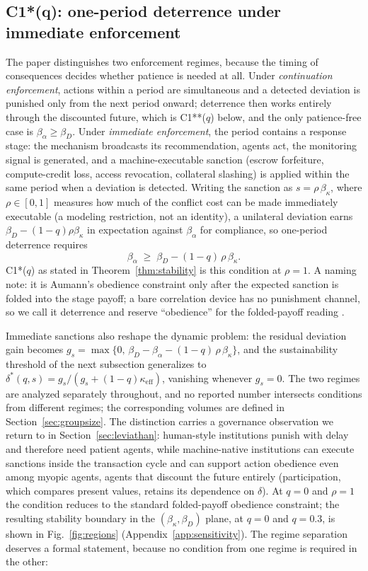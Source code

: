 \documentclass[manuscript,screen,review]{jair}
\begin{document}
\subsection{C1*(q): one-period deterrence under immediate enforcement}
\label{sec:c1star}

The paper distinguishes two enforcement regimes, because the timing of consequences decides whether patience is needed at all. Under \emph{continuation enforcement}, actions within a period are simultaneous and a detected deviation is punished only from the next period onward; deterrence then works entirely through the discounted future, which is C1**($q$) below, and the only patience-free case is $\beta_\alpha \geq \beta_D$. Under \emph{immediate enforcement}, the period contains a response stage: the mechanism broadcasts its recommendation, agents act, the monitoring signal is generated, and a machine-executable sanction (escrow forfeiture, compute-credit loss, access revocation, collateral slashing) is applied within the same period when a deviation is detected. Writing the sanction as $s = \rho\,\beta_\kappa$, where $\rho \in [0,1]$ measures how much of the conflict cost can be made immediately executable (a modeling restriction, not an identity), a unilateral deviation earns $\beta_D - (1-q)\rho\beta_\kappa$ in expectation against $\beta_\alpha$ for compliance, so one-period deterrence requires
\begin{equation*}
\beta_\alpha \;\geq\; \beta_D - (1-q)\,\rho\,\beta_\kappa .
\end{equation*}
C1*($q$) as stated in Theorem~\ref{thm:stability} is this condition at $\rho = 1$. A naming note: it is Aumann's obedience constraint only after the expected sanction is folded into the stage payoff; a bare correlation device has no punishment channel, so we call it deterrence and reserve ``obedience'' for the folded-payoff reading \cite{aumann.1974,aumann.1987}.

Immediate sanctions also reshape the dynamic problem: the residual deviation gain becomes $g_s = \max\{0,\, \beta_D - \beta_\alpha - (1-q)\,\rho\,\beta_\kappa\}$, and the sustainability threshold of the next subsection generalizes to $\delta^*(q,s) = g_s/(g_s + (1-q)\kappa_{\mathrm{eff}})$, vanishing whenever $g_s = 0$. The two regimes are analyzed separately throughout, and no reported number intersects conditions from different regimes; the corresponding volumes are defined in Section~\ref{sec:groupsize}. The distinction carries a governance observation we return to in Section~\ref{sec:leviathan}: human-style institutions punish with delay and therefore need patient agents, while machine-native institutions can execute sanctions inside the transaction cycle and can support action obedience even among myopic agents, agents that discount the future entirely (participation, which compares present values, retains its dependence on $\delta$). At $q=0$ and $\rho=1$ the condition reduces to the standard folded-payoff obedience constraint; the resulting stability boundary in the $(\beta_\kappa, \beta_D)$ plane, at $q=0$ and $q=0.3$, is shown in Fig.~\ref{fig:regions} (Appendix~\ref{app:sensitivity}). The regime separation deserves a formal statement, because no condition from one regime is required in the other:
\end{document}

